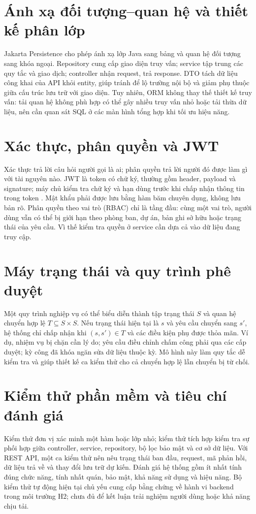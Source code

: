 \documentclass[12pt,a4paper,oneside]{report}
\begin{document}
\section{Ánh xạ đối tượng--quan hệ và thiết kế phân lớp}
Jakarta Persistence cho phép ánh xạ lớp Java sang bảng và quan hệ đối tượng sang khóa ngoại. Repository cung cấp giao diện truy vấn; service tập trung các quy tắc và giao dịch; controller nhận request, trả response. DTO tách dữ liệu công khai của API khỏi entity, giúp tránh để lộ trường nội bộ và giảm phụ thuộc giữa cấu trúc lưu trữ với giao diện. Tuy nhiên, ORM không thay thế thiết kế truy vấn: tải quan hệ không phù hợp có thể gây nhiều truy vấn nhỏ hoặc tải thừa dữ liệu, nên cần quan sát SQL ở các màn hình tổng hợp khi tối ưu hiệu năng.

\section{Xác thực, phân quyền và JWT}
Xác thực trả lời câu hỏi người gọi là ai; phân quyền trả lời người đó được làm gì với tài nguyên nào. JWT là token có chữ ký, thường gồm header, payload và signature; máy chủ kiểm tra chữ ký và hạn dùng trước khi chấp nhận thông tin trong token \cite{jwt}. Mật khẩu phải được lưu bằng hàm băm chuyên dụng, không lưu bản rõ. Phân quyền theo vai trò (RBAC) chỉ là tầng đầu: cùng một vai trò, người dùng vẫn có thể bị giới hạn theo phòng ban, dự án, bản ghi sở hữu hoặc trạng thái của yêu cầu. Vì thế kiểm tra quyền ở service cần dựa cả vào dữ liệu đang truy cập.

\section{Máy trạng thái và quy trình phê duyệt}
Một quy trình nghiệp vụ có thể biểu diễn thành tập trạng thái $S$ và quan hệ chuyển hợp lệ $T\subseteq S\times S$. Nếu trạng thái hiện tại là $s$ và yêu cầu chuyển sang $s'$, hệ thống chỉ chấp nhận khi $(s,s')\in T$ và các điều kiện phụ được thỏa mãn. Ví dụ, nhiệm vụ bị chặn cần lý do; yêu cầu điều chỉnh chấm công phải qua các cấp duyệt; kỳ công đã khóa ngăn sửa dữ liệu thuộc kỳ. Mô hình này làm quy tắc dễ kiểm tra và giúp thiết kế ca kiểm thử cho cả chuyển hợp lệ lẫn chuyển bị từ chối.

\section{Kiểm thử phần mềm và tiêu chí đánh giá}
Kiểm thử đơn vị xác minh một hàm hoặc lớp nhỏ; kiểm thử tích hợp kiểm tra sự phối hợp giữa controller, service, repository, bộ lọc bảo mật và cơ sở dữ liệu. Với REST API, một ca kiểm thử nên nêu trạng thái ban đầu, request, mã phản hồi, dữ liệu trả về và thay đổi lưu trữ dự kiến. Đánh giá hệ thống gồm ít nhất tính đúng chức năng, tính nhất quán, bảo mật, khả năng sử dụng và hiệu năng. Bộ kiểm thử tự động hiện tại chủ yếu cung cấp bằng chứng về hành vi backend trong môi trường H2; chưa đủ để kết luận trải nghiệm người dùng hoặc khả năng chịu tải.
\end{document}
